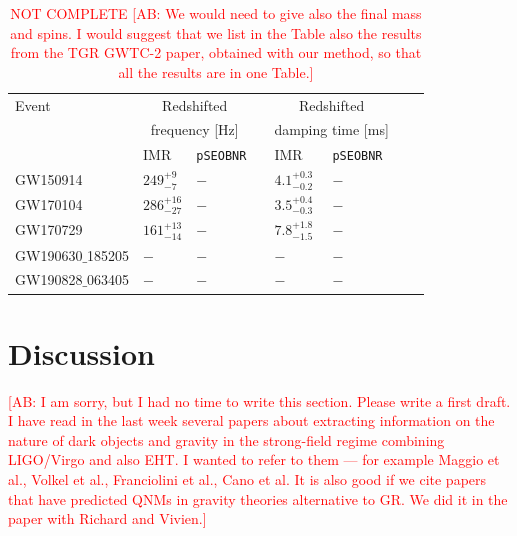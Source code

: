 \documentclass[twocolumn,prd,aps,superscriptaddress,preprintnumbers,tightenlines,showpacs,nofootinbib,eqsecnum,amsfonts,amsmath]{revtex4-1}
\newcommand{\comment}[1]{\textcolor{red}{[#1]}}
\newcommand{\pSEOB}{\texttt{pSEOBNR}}
\begin{document}
\begin{table}
\begin{flushleft}
\begin{tabular}{llllllll}
\toprule
Event & \multicolumn{2}{c}{Redshifted} & \hphantom{X} & \multicolumn{2}{c}{Redshifted} \\
& \multicolumn{2}{c}{frequency [Hz]} & \hphantom{X} & \multicolumn{2}{c}{damping time [ms]} \\[0.075cm]
\hline
& IMR  & \pSEOB & \hphantom{X} & IMR  & \pSEOB \\
\hline

GW150914 &
$249^{+9}_{-7}$ &
$-$ &
\hphantom{X} &
$4.1^{+0.3}_{-0.2}$ &
$-$
\\[0.075cm]

GW170104 &
$286^{+16}_{-27}$ &
$-$ &
\hphantom{X} &
$3.5^{+0.4}_{-0.3}$ &
$-$
\\[0.075cm]

GW170729 &
$161^{+13}_{-14}$ &
$-$ &
\hphantom{X} &
$7.8^{+1.8}_{-1.5}$ &
$-$
\\[0.075cm]

GW190630$\_$185205 &
$-$ &
$-$ &
\hphantom{X} &
$-$ &
$-$
\\[0.075cm]

GW190828$\_$063405 &
$-$ &
$-$ &
\hphantom{X} &
$-$ &
$-$
\\[0.075cm]
\hline
\bottomrule
\end{tabular}
\caption{\textcolor{red}{NOT COMPLETE} \comment{AB: We would need to give also the final mass and spins. I would suggest that we list in the Table 
also the results from the TGR GWTC-2 paper, obtained with our method, so that all the results are in one Table.}}
\label{tab:qnm_o1o2_results}
\end{flushleft}
\end{table}

\section{Discussion}\label{sec:discussion}

\comment{AB: I am sorry, but I had no time to write this section. Please write a first draft. I have read in the last week several papers 
about extracting information on the nature of dark objects and gravity in the strong-field regime combining LIGO/Virgo and also 
EHT. I wanted to refer to them --- for example Maggio et al., Volkel et al., Franciolini et al., Cano et al. 
It is also good if we cite papers that have predicted QNMs in gravity theories alternative to GR. We did it in the paper with 
Richard and Vivien.}
\end{document}
